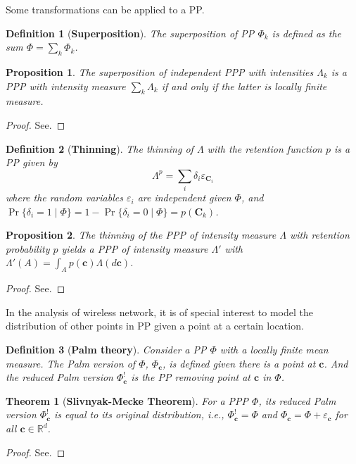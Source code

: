 \documentclass[a4paper,twocolumn]{IEEEtran}
\newtheorem{definition}{\textbf{Definition}}
\newtheorem{proposition}{\textbf{Proposition}}
\newtheorem{theorem}{\textbf{Theorem}}
\begin{document}
Some transformations can be applied to a PP.
\begin{definition}[\textbf{Superposition}]
The superposition of PP $\Phi_k$ is defined as the sum $\Phi=\sum_k \Phi_k$. 	
\end{definition}
\begin{proposition}
The superposition of independent PPP with intensities $\Lambda_k$ is a PPP with intensity measure $\sum_k \Lambda_k$ if and only if the latter is locally finite measure.
\end{proposition}	
\begin{proof}
See.
\end{proof}
\begin{definition}[\textbf{Thinning}]
The thinning of $\Lambda$ with the retention function $p$ is a PP given by
\begin{displaymath}
\Lambda^p = \sum_i \delta_i \varepsilon_{\bm{C}_i} 
\end{displaymath}
where the random variables $\varepsilon_i$ are independent given $\Phi$, and $\Pr\{\delta_i=1\mid \Phi\}=1-\Pr\{\delta_i=0\mid \Phi\}=p(\bm{C}_k)$.
\end{definition}
\begin{proposition}\label{prop:PPPthinning}
The thinning of the PPP of intensity measure $\Lambda$ with retention probability $p$ yields a PPP of intensity measure $\Lambda'$ with $\Lambda'(A)=\int_A p(\bm{c}) \Lambda(d\bm{c})$.
\end{proposition}
\begin{proof}
See.
\end{proof}
In the analysis of wireless network, it is of special interest to model the distribution of other points in PP given a point at a certain location.
\begin{definition}[\textbf{Palm theory}]
Consider a PP $\Phi$ with a locally finite mean measure. The Palm version of $\Phi$, $\Phi_{\bm{c}}$, is defined given there is a point at $\bm{c}$. And the reduced Palm version $\Phi_{\bm{c}}^!$ is the PP removing point at $\bm{c}$ in $\Phi$.  
\end{definition}
\begin{theorem}[\textbf{Slivnyak-Mecke Theorem}]
For a PPP $\Phi$, its reduced Palm version $\Phi_{\bm{c}}^!$ is equal to its original distribution, i.e., $\Phi_{\bm{c}}^! = \Phi$ and $\Phi_{\bm{c}} = \Phi+\varepsilon_{\bm{c}}$ for all $\bm{c}\in\mathbb{R}^d$.    
\end{theorem}
\begin{proof}
See.
\end{proof}
\end{document}
